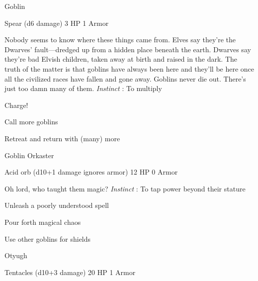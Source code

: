 \startMonsterName
Goblin	 
\stopMonsterName
 

Spear (d6 damage)	3 HP	1 Armor

 


 
\startMonsterDescription
Nobody seems to know where these things came from. Elves say they’re the Dwarves’ fault—dredged up from a hidden place beneath the earth. Dwarves say they’re bad Elvish children, taken away at birth and raised in the dark. The truth of the matter is that goblins have always been here and they’ll be here once all the civilized races have fallen and gone away. Goblins never die out. There’s just too damn many of them. {\em Instinct} : To multiply
\stopMonsterDescription
 
\startitemize[1,packed]

\item Charge!

 
\item Call more goblins

 
\item Retreat and return with (many) more


\stopitemize
 
\startMonsterName
Goblin Orkaster	 
\stopMonsterName
 

Acid orb (d10+1 damage ignores armor)	12 HP	0 Armor

 


 
\startMonsterDescription
Oh lord, who taught them magic? {\em Instinct} : To tap power beyond their stature
\stopMonsterDescription
 
\startitemize[1,packed]

\item Unleash a poorly understood spell

 
\item Pour forth magical chaos

 
\item Use other goblins for shields


\stopitemize
 
\startMonsterName
Otyugh	 
\stopMonsterName
 

Tentacles (d10+3 damage)	20 HP	1 Armor

 


